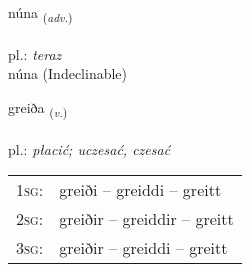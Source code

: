 \documentclass[frontgrid, backgrid]{flacards}\usepackage[]{graphicx}\usepackage[]{xcolor}
\begin{document}

\renewcommand{\flhead}{\vskip5pt \fboxsep=0pt {\small\bfseries\footnotesize Atviksorð | przysłówek}}
\renewcommand{\fcfoot}{\vskip5pt \fboxsep=0pt \hspace{2pt}{\small\bfseries\footnotesize 1K}}

\renewcommand{\blhead}{\vskip5pt {\small\bfseries\footnotesize Atviksorð | przysłówek }}
\renewcommand{\bcfoot}{\vskip5pt \hspace{2pt}{\small\bfseries\footnotesize 1K}}


{núna \small{\textsubscript{(\textit{adv.})}} \\[1ex]
\textphonetic{[nuːna]} \\
pl.: \emph{teraz} \\  [2ex]
núna (Indeclinable)}

\renewcommand{\flhead}{\vskip5pt \fboxsep=0pt {\small\bfseries\footnotesize Sagnorð | czasownik}}
\renewcommand{\fcfoot}{\vskip5pt \fboxsep=0pt \hspace{2pt}{\small\bfseries\footnotesize 1K}}

\renewcommand{\blhead}{\vskip5pt {\small\bfseries\footnotesize Sagnorð | czasownik }}
\renewcommand{\bcfoot}{\vskip5pt \hspace{2pt}{\small\bfseries\footnotesize 1K}}


{greiða \small{\textsubscript{(\textit{v.})}} \\[1ex] %
\textphonetic{[kreiːða]} \\
pl.: \emph{płacić; uczesać, czesać} \\  [2ex]
\renewcommand*{\arraystretch}{0.8}
\begin{tabular}{p{1cm}l}
\textsc{1sg}: & greiði -- greiddi -- greitt \\ 
\textsc{2sg}: & greiðir -- greiddir -- greitt \\ 
\textsc{3sg}: & greiðir -- greiddi -- greitt \\ 
\end{tabular}
}

\renewcommand{\flhead}{\vskip5pt \fboxsep=0pt {\small\bfseries\footnotesize Atviksorð | przysłówek}}
\renewcommand{\fcfoot}{\vskip5pt \fboxsep=0pt \hspace{2pt}{\small\bfseries\footnotesize 1K}}
\end{document}
